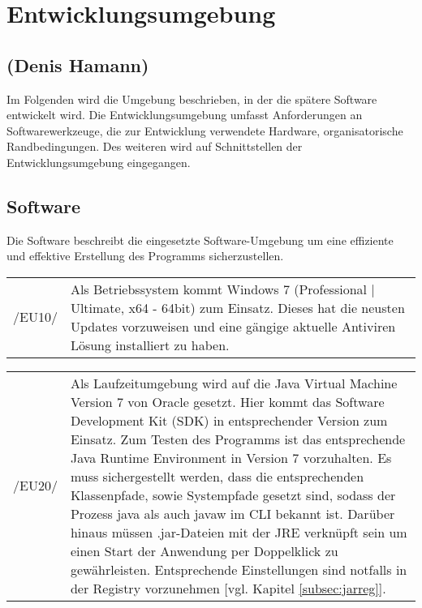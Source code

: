 \section{Entwicklungsumgebung}
\label{sec:Entwicklungsumgebung}

\subsection*{(Denis Hamann)}

Im Folgenden wird die Umgebung beschrieben, in der die spätere Software entwickelt wird.
Die Entwicklungsumgebung umfasst Anforderungen an Softwarewerkzeuge, die zur Entwicklung verwendete Hardware, organisatorische
Randbedingungen. Des weiteren wird auf Schnittstellen der Entwicklungsumgebung eingegangen.

\subsection{Software}
\label{subsec:devsoftware}

Die Software beschreibt die eingesetzte Software-Umgebung um eine effiziente und effektive Erstellung des Programms sicherzustellen.\\

\begin{tabular}{p{1.5cm}p{14.5cm}}

	 /EU10/	&  Als Betriebssystem kommt Windows 7 (Professional | Ultimate, x64 - 64bit) zum Einsatz. Dieses hat die neusten Updates vorzuweisen und eine gängige aktuelle Antiviren Lösung installiert zu haben.\\[0.25cm]

\end{tabular}

\begin{tabular}{p{1.5cm}p{14.5cm}}

	 /EU20/	&  Als Laufzeitumgebung wird auf die Java Virtual Machine Version 7 von Oracle gesetzt. Hier kommt das Software Development Kit (SDK) in entsprechender Version zum Einsatz.
Zum Testen des Programms ist das entsprechende Java Runtime Environment in Version 7 vorzuhalten. Es muss sichergestellt werden, dass die entsprechenden Klassenpfade, sowie Systempfade gesetzt sind, sodass der Prozess java als auch javaw im CLI bekannt ist. Darüber hinaus müssen .jar-Dateien mit der JRE verknüpft sein um einen Start der Anwendung per Doppelklick zu gewährleisten. Entsprechende Einstellungen sind notfalls in der Registry vorzunehmen [vgl. Kapitel \ref{subsec:jarreg}].\\[0.25cm]

\end{tabular}

